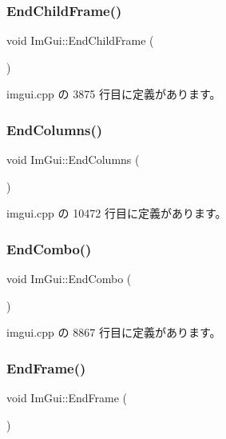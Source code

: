 \subsubsection{\texorpdfstring{End\+Child\+Frame()}{EndChildFrame()}}
{\footnotesize\ttfamily void Im\+Gui\+::\+End\+Child\+Frame (\begin{DoxyParamCaption}{ }\end{DoxyParamCaption})}



 imgui.\+cpp の 3875 行目に定義があります。

\mbox{\label{namespace_im_gui_af93bed3bce5475fe4d525d744f16aa20}} 
\subsubsection{\texorpdfstring{End\+Columns()}{EndColumns()}}
{\footnotesize\ttfamily void Im\+Gui\+::\+End\+Columns (\begin{DoxyParamCaption}{ }\end{DoxyParamCaption})}



 imgui.\+cpp の 10472 行目に定義があります。

\mbox{\label{namespace_im_gui_a63434692d7de278875c7ea0143fbe6e4}} 
\subsubsection{\texorpdfstring{End\+Combo()}{EndCombo()}}
{\footnotesize\ttfamily void Im\+Gui\+::\+End\+Combo (\begin{DoxyParamCaption}{ }\end{DoxyParamCaption})}



 imgui.\+cpp の 8867 行目に定義があります。

\mbox{\label{namespace_im_gui_a246c37da45e88a12ade440a0feacb4ee}} 
\subsubsection{\texorpdfstring{End\+Frame()}{EndFrame()}}
{\footnotesize\ttfamily void Im\+Gui\+::\+End\+Frame (\begin{DoxyParamCaption}{ }\end{DoxyParamCaption})}



